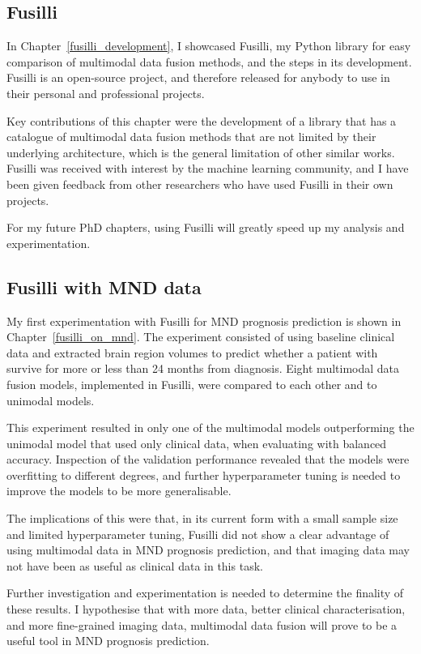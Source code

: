 \subsection{Fusilli}

In Chapter~\ref{fusilli_development}, I showcased Fusilli, my Python library for easy comparison of multimodal data fusion methods, and the steps in its development.
Fusilli is an open-source project, and therefore released for anybody to use in their personal and professional projects.

Key contributions of this chapter were the development of a library that has a catalogue of multimodal data fusion methods that are not limited by their underlying architecture, which is the general limitation of other similar works.
Fusilli was received with interest by the machine learning community, and I have been given feedback from other researchers who have used Fusilli in their own projects.

For my future PhD chapters, using Fusilli will greatly speed up my analysis and experimentation.

\subsection{Fusilli with MND data}

My first experimentation with Fusilli for MND prognosis prediction is shown in Chapter~\ref{fusilli_on_mnd}.
The experiment consisted of using baseline clinical data and extracted brain region volumes to predict whether a patient with survive for more or less than 24 months from diagnosis.
Eight multimodal data fusion models, implemented in Fusilli, were compared to each other and to unimodal models.

This experiment resulted in only one of the multimodal models outperforming the unimodal model that used only clinical data, when evaluating with balanced accuracy.
Inspection of the validation performance revealed that the models were overfitting to different degrees, and further hyperparameter tuning is needed to improve the models to be more generalisable.

The implications of this were that, in its current form with a small sample size and limited hyperparameter tuning, Fusilli did not show a clear advantage of using multimodal data in MND prognosis prediction, and that imaging data may not have been as useful as clinical data in this task.

Further investigation and experimentation is needed to determine the finality of these results.
I hypothesise that with more data, better clinical characterisation, and more fine-grained imaging data, multimodal data fusion will prove to be a useful tool in MND prognosis prediction.

